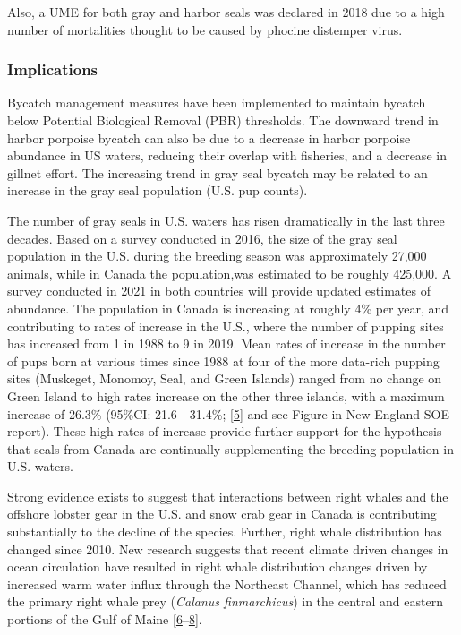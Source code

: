 \documentclass[
  10pt,
]{article}
\begin{document}
Also, a UME for both gray and harbor seals was declared in 2018 due to a
high number of mortalities thought to be caused by phocine distemper
virus.

\hypertarget{implications-5}{%
\subsubsection{Implications}\label{implications-5}}

Bycatch management measures have been implemented to maintain bycatch
below Potential Biological Removal (PBR) thresholds. The downward trend
in harbor porpoise bycatch can also be due to a decrease in harbor
porpoise abundance in US waters, reducing their overlap with fisheries,
and a decrease in gillnet effort. The increasing trend in gray seal
bycatch may be related to an increase in the gray seal population (U.S.
pup counts).

The number of gray seals in U.S. waters has risen dramatically in the
last three decades. Based on a survey conducted in 2016, the size of the
gray seal population in the U.S. during the breeding season was
approximately 27,000 animals, while in Canada the population,was
estimated to be roughly 425,000. A survey conducted in 2021 in both
countries will provide updated estimates of abundance. The population in
Canada is increasing at roughly 4\% per year, and contributing to rates
of increase in the U.S., where the number of pupping sites has increased
from 1 in 1988 to 9 in 2019. Mean rates of increase in the number of
pups born at various times since 1988 at four of the more data-rich
pupping sites (Muskeget, Monomoy, Seal, and Green Islands) ranged from
no change on Green Island to high rates increase on the other three
islands, with a maximum increase of 26.3\% (95\%CI: 21.6 - 31.4\%;
{[}\protect\hyperlink{ref-wood_rates_2020}{5}{]} and see Figure in New
England SOE report). These high rates of increase provide further
support for the hypothesis that seals from Canada are continually
supplementing the breeding population in U.S. waters.

Strong evidence exists to suggest that interactions between right whales
and the offshore lobster gear in the U.S. and snow crab gear in Canada
is contributing substantially to the decline of the species. Further,
right whale distribution has changed since 2010. New research suggests
that recent climate driven changes in ocean circulation have resulted in
right whale distribution changes driven by increased warm water influx
through the Northeast Channel, which has reduced the primary right whale
prey (\emph{Calanus finmarchicus}) in the central and eastern portions
of the Gulf of Maine
{[}\protect\hyperlink{ref-hayes_north_2018}{6}--\protect\hyperlink{ref-sorochan_north_2019}{8}{]}.
\end{document}
